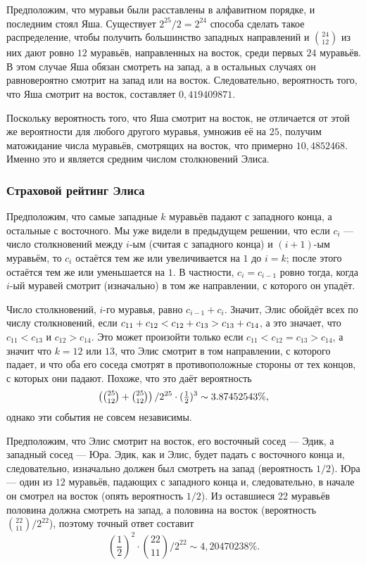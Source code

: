 Предположим, что муравьи были расставлены в алфавитном порядке, и последним стоял Яша.
Существует $2^{25}/2=2^{24}$ способа сделать такое распределение, чтобы получить большинство западных направлений и $\binom{24}{12}$
из них дают ровно $12$ муравьёв, направленных на восток, среди первых $24$ муравьёв.
В этом случае Яша обязан смотреть на запад,
а в остальных случаях он равновероятно смотрит на запад или на восток.
Следовательно, вероятность того, что Яша смотрит на восток, составляет
$0{,}419409871$.

Поскольку вероятность того, что Яша смотрит на восток, не отличается от этой же вероятности для любого другого муравья, умножив её на $25$, получим матожидание числа муравьёв, смотрящих на восток, что примерно $10{,}4852468$.
Именно это и является средним числом столкновений Элиса.

\subsubsection*{Страховой рейтинг Элиса}

Предположим, что самые западные $k$ муравьёв падают с западного конца,
а остальные с восточного.
Мы уже видели в предыдущем решении, что если $c_i$ --- число столкновений между $i$-ым (считая с западного конца) и $(i + 1)$-ым муравьём, то $c_i$ остаётся тем же или увеличивается на $1$ до $i = k$; после этого остаётся тем же или уменьшается на $1$.
В частности, $c_i=c_{i-1}$ ровно тогда, когда $i$-ый муравей смотрит (изначально) в том же направлении, с которого он упадёт.

Число столкновений, $i$-го муравья, равно $c_{i-1}+c_{i}$.
Значит, Элис обойдёт всех по числу столкновений, если $c_{11}+c_{12}\z<c_{12}\z+c_{13}\z>c_{13}\z+c_{14}$, а это значает, что  $c_{11}<c_{13}$ и $c_{12}>c_{14}$.
Это может произойти только если $c_{11}<c_{12}=c_{13}>c_{14}$, а значит что $k = 12$ или $13$, что Элис смотрит в том направлении, с которого падает,
и что оба его соседа смотрят в противоположные стороны от тех концов, с которых они падают.
Похоже, что это даёт вероятность 
\[\left(\tbinom{25}{12}+\tbinom{25}{12}\right)/2^{25}\cdot (\tfrac12)^3\sim 3.87452543\%,\]
однако эти события не совсем независимы.

Предположим, что Элис смотрит на восток, его восточный сосед --- Эдик, а западный сосед --- Юра.
Эдик, как и Элис, будет падать с восточного конца и, следовательно, изначально должен был смотреть на запад (вероятность $1/2$).
Юра --- один из $12$ муравьёв, падающих с западного конца и, следовательно, в начале он смотрел на восток (опять вероятность $1/2$).
Из оставшиеся 22 муравьёв половина должна смотреть на запад, а половина на восток (вероятность $\binom{22}{11}/2^{22}$), поэтому точный ответ составит
\[\left(\frac12\right)^2\cdot\binom{22}{11}/2^{22}\sim 4{,}20470238\%.\]

